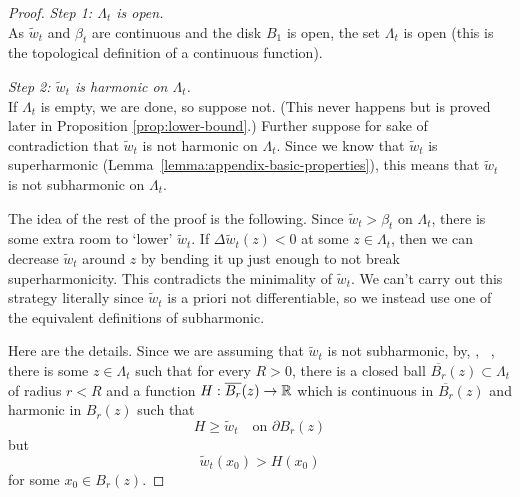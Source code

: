 \documentclass[12pt]{amsart}
\numberwithin{equation}{section}
\newcommand{\lssshift}[2]{\hyperref[eq:appendix-least-supersolution]{\tilde{w}^{#1}_{#2}}}
\newcommand{\cluster}[2]{\hyperref[eq:non-co-set]{\mathit{\Lambda}^{#1}_{#2}}}
\begin{document}
	\begin{proof}
		{\it Step 1: ${\cluster{}{t}}$ is open.} \\
		As $\lssshift{}{t}$ and $\beta_t$ are continuous and the disk $B_1$ is open, the set ${\cluster{}{t}}$
		is open (this is the topological definition of a continuous function). 
		
		{\it Step 2: $\lssshift{}{t}$ is harmonic on ${\cluster{}{t}}$.} \\
		If ${\cluster{}{t}}$ is empty, we are done, so suppose not. (This never happens but is proved later in Proposition \ref{prop:lower-bound}.) 
		Further suppose for sake of contradiction that $\lssshift{}{t}$ is not harmonic on ${\cluster{}{t}}$. Since we know that $\lssshift{}{t}$ is superharmonic (Lemma~\ref{lemma:appendix-basic-properties}), this means that $\lssshift{}{t}$ is not subharmonic on ${\cluster{}{t}}$.  
		
		The idea of the rest of the proof is the following. Since $\lssshift{}{t} > \beta_t$ on ${\cluster{}{t}}$, there is some extra room to `lower' $\lssshift{}{t}$. If $\Delta \lssshift{}{t}(z) < 0$ at some $z \in {\cluster{}{t}}$, then we can decrease $\lssshift{}{t}$ around $z$ by bending it up just enough to not break superharmonicity. This contradicts the minimality of $\lssshift{}{t}$. 
		We can't carry out this strategy literally since $\lssshift{}{t}$ is a priori not differentiable, so we instead use one of the equivalent definitions of subharmonic. 
		
		Here are the details. Since we are assuming that $\lssshift{}{t}$ is not subharmonic, by, \eg,
		~\cite[Theorem 3.2.2]{armitage2000classical}, there is some $z \in {\cluster{}{t}}$ such that for every $R > 0$, there is a closed ball 
		$\overline{B_r}(z) \subset {\cluster{}{t}}$ of radius $r < R$ and a function $H:\overline{B_r}(z) \to \mathbb{R}$ which is continuous in $\overline{B_r}(z)$ and harmonic in $B_r(z)$ such that 
		\begin{equation}  \label{eq:smaller}
		H \geq \lssshift{}{t} \quad \mbox{on $\partial B_r(z)$}  
		\end{equation}
		but
		\begin{equation} \label{eq:below-w}
		\lssshift{}{t}(x_0) > H(x_0)
		\end{equation}
		for some $x_0 \in B_r(z)$. 
		

\end{proof}
\end{document}
